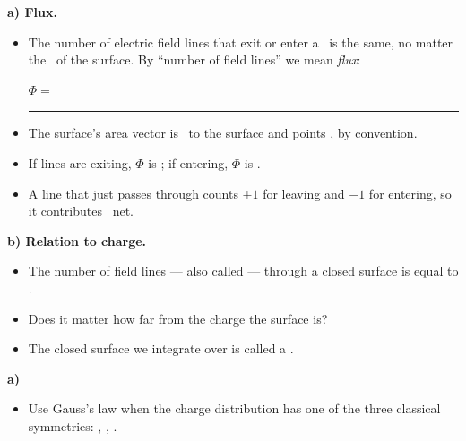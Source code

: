 \documentclass[12pt]{article}
\newcommand{\eqline}[2][\linewidth]{%
  \par\vspace{1mm}\noindent #2\par\vspace{-0.5mm}%
  \noindent\textcolor{rulehue}{\rule{#1}{0.5pt}}\par\vspace{4mm}%
}
\begin{document}



\textbf{a) Flux.}
\begin{itemize}[itemsep=9pt,parsep=4pt,topsep=4pt]
\item The number of electric field lines that exit or enter a \bl[5.2cm]\ is the same,
no matter the \bl[4.4cm]\ of the surface. By ``number of field lines'' we mean \emph{flux}:
\eqline{$\Phi = $}
\item The surface's area vector is \bl[4.0cm]\ to the surface and points \bl[3.2cm], by
convention.
\item If lines are exiting, $\Phi$ is \bl[3.0cm]; if entering, $\Phi$ is \bl[3.0cm].
\item A line that just passes through counts $+1$ for leaving and $-1$ for entering, so
it contributes \bl[2.4cm]\ net.
\end{itemize}

\textbf{b) Relation to charge.}
\begin{itemize}[itemsep=9pt,parsep=4pt,topsep=4pt]
\item The number of field lines --- also called \bl[4.4cm] --- through a closed surface
is equal to \bl[6.0cm].
\item Does it matter how far from the charge the surface is? \bl[2.6cm]
\item The closed surface we integrate over is called a \bl[5.2cm].
\end{itemize}



\textbf{a)}
\begin{itemize}[itemsep=9pt,parsep=4pt,topsep=4pt]
\item Use Gauss's law when the charge distribution has one of the three classical
symmetries: \bl[4.4cm], \bl[4.4cm], \bl[4.4cm].
\end{itemize}
\end{document}
